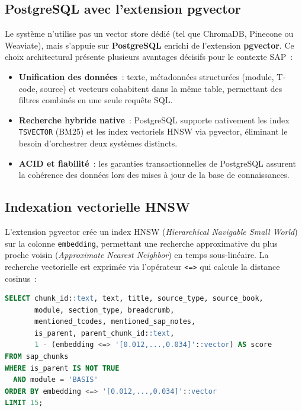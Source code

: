 \subsection{PostgreSQL avec l'extension pgvector}

Le système n'utilise pas un vector store dédié (tel que ChromaDB, Pinecone ou Weaviate), mais s'appuie sur \textbf{PostgreSQL} enrichi de l'extension \textbf{pgvector}. Ce choix architectural présente plusieurs avantages décisifs pour le contexte SAP~:

\begin{itemize}[leftmargin=2em]
  \item \textbf{Unification des données}~: texte, métadonnées structurées (module, T-code, source) et vecteurs cohabitent dans la même table, permettant des filtres combinés en une seule requête SQL.
  \item \textbf{Recherche hybride native}~: PostgreSQL supporte nativement les index \texttt{TSVECTOR} (BM25) et les index vectoriels HNSW via pgvector, éliminant le besoin d'orchestrer deux systèmes distincts.
  \item \textbf{ACID et fiabilité}~: les garanties transactionnelles de PostgreSQL assurent la cohérence des données lors des mises à jour de la base de connaissances.
  \end{itemize}

\subsection{Indexation vectorielle HNSW}

L'extension pgvector crée un index HNSW (\textit{Hierarchical Navigable Small World}) sur la colonne \texttt{embedding}, permettant une recherche approximative du plus proche voisin (\textit{Approximate Nearest Neighbor}) en temps sous-linéaire. La recherche vectorielle est exprimée via l'opérateur \texttt{<=>} qui calcule la distance cosinus~:

\begin{lstlisting}[language=SQL, caption={Requête de recherche vectorielle avec pgvector}]
SELECT chunk_id::text, text, title, source_type, source_book,
       module, section_type, breadcrumb,
       mentioned_tcodes, mentioned_sap_notes,
       is_parent, parent_chunk_id::text,
       1 - (embedding <=> '[0.012,...,0.034]'::vector) AS score
FROM sap_chunks
WHERE is_parent IS NOT TRUE
  AND module = 'BASIS'
ORDER BY embedding <=> '[0.012,...,0.034]'::vector
LIMIT 15;
\end{lstlisting}

